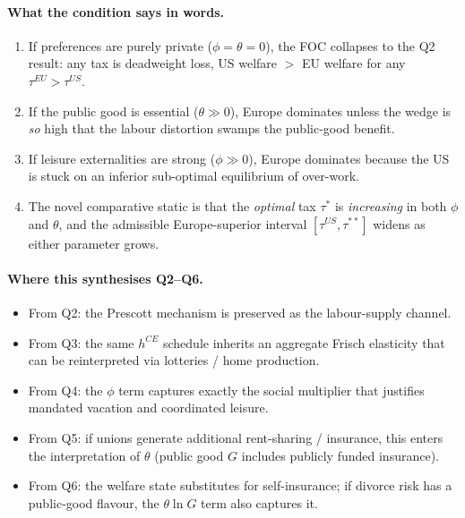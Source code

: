 \documentclass[11pt,a4paper]{article}
\begin{document}
\paragraph{What the condition says in words.}
\begin{enumerate}[leftmargin=*,itemsep=2pt]
    \item If preferences are purely private ($\phi=\theta=0$), the FOC collapses to the Q2 result: any tax is deadweight loss, US welfare $>$ EU welfare for any $\tau^{EU}>\tau^{US}$.
    \item If the public good is essential ($\theta\gg 0$), Europe dominates unless the wedge is \emph{so} high that the labour distortion swamps the public-good benefit.
    \item If leisure externalities are strong ($\phi\gg 0$), Europe dominates because the US is stuck on an inferior sub-optimal equilibrium of over-work.
    \item The novel comparative static is that the \emph{optimal} tax $\tau^{*}$ is \emph{increasing} in both $\phi$ and $\theta$, and the admissible Europe-superior interval $[\tau^{US},\tau^{**}]$ widens as either parameter grows.
\end{enumerate}

\paragraph{Where this synthesises Q2--Q6.}
\begin{itemize}[leftmargin=*,itemsep=2pt]
    \item From Q2: the Prescott mechanism is preserved as the labour-supply channel.
    \item From Q3: the same $h^{CE}$ schedule inherits an aggregate Frisch elasticity that can be reinterpreted via lotteries / home production.
    \item From Q4: the $\phi$ term captures exactly the social multiplier that justifies mandated vacation and coordinated leisure.
    \item From Q5: if unions generate additional rent-sharing / insurance, this enters the interpretation of $\theta$ (public good $G$ includes publicly funded insurance).
    \item From Q6: the welfare state substitutes for self-insurance; if divorce risk has a public-good flavour, the $\theta\ln G$ term also captures it.
\end{itemize}
\end{document}
